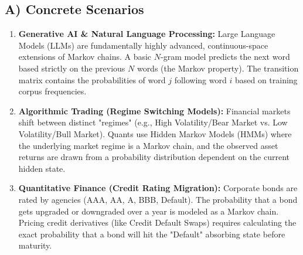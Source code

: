 \documentclass[11pt, letterpaper]{article}
\theoremstyle{definition}
\theoremstyle{remark}
\begin{document}
\subsection{A) Concrete Scenarios}
\begin{enumerate}
    \item \textbf{Generative AI \& Natural Language Processing:} Large Language Models (LLMs) are fundamentally highly advanced, continuous-space extensions of Markov chains. A basic $N$-gram model predicts the next word based strictly on the previous $N$ words (the Markov property). The transition matrix contains the probabilities of word $j$ following word $i$ based on training corpus frequencies.
    \item \textbf{Algorithmic Trading (Regime Switching Models):} Financial markets shift between distinct "regimes" (e.g., High Volatility/Bear Market vs. Low Volatility/Bull Market). Quants use Hidden Markov Models (HMMs) where the underlying market regime is a Markov chain, and the observed asset returns are drawn from a probability distribution dependent on the current hidden state.
    \item \textbf{Quantitative Finance (Credit Rating Migration):} Corporate bonds are rated by agencies (AAA, AA, A, BBB, Default). The probability that a bond gets upgraded or downgraded over a year is modeled as a Markov chain. Pricing credit derivatives (like Credit Default Swaps) requires calculating the exact probability that a bond will hit the "Default" absorbing state before maturity.
\end{enumerate}
\end{document}
